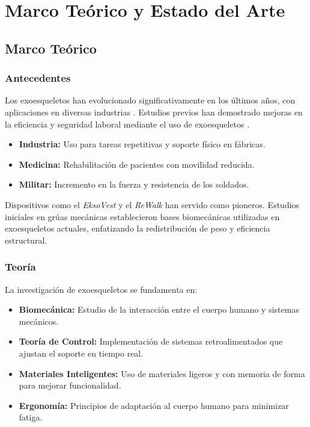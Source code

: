 \chapter{Marco Teórico y Estado del Arte}

\section{Marco Teórico}

\subsection{Antecedentes}
Los exoesqueletos han evolucionado significativamente en los últimos años, con aplicaciones en diversas industrias \cite{Anderson2024}. Estudios previos han demostrado mejoras en la eficiencia y seguridad laboral mediante el uso de exoesqueletos \cite{Brown2025}.
\begin{itemize}
    \item \textbf{Industria:} Uso para tareas repetitivas y soporte físico en fábricas.
    \item \textbf{Medicina:} Rehabilitación de pacientes con movilidad reducida.
    \item \textbf{Militar:} Incremento en la fuerza y resistencia de los soldados.
\end{itemize}

Dispositivos como el \textit{EksoVest} y el \textit{ReWalk} han servido como pioneros. Estudios iniciales en grúas mecánicas establecieron bases biomecánicas utilizadas en exoesqueletos actuales, enfatizando la redistribución de peso y eficiencia estructural.

\subsection{Teoría}
La investigación de exoesqueletos se fundamenta en:
\begin{itemize}
    \item \textbf{Biomecánica:} Estudio de la interacción entre el cuerpo humano y sistemas mecánicos.
    \item \textbf{Teoría de Control:} Implementación de sistemas retroalimentados que ajustan el soporte en tiempo real.
    \item \textbf{Materiales Inteligentes:} Uso de materiales ligeros y con memoria de forma para mejorar funcionalidad.
    \item \textbf{Ergonomía:} Principios de adaptación al cuerpo humano para minimizar fatiga.
\end{itemize}

